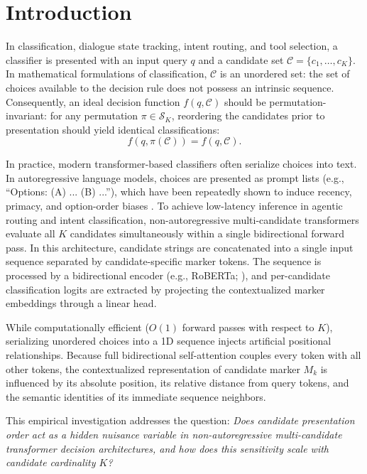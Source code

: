 \documentclass[11pt,a4paper]{article}
\begin{document}
\section{Introduction}

In classification, dialogue state tracking, intent routing, and tool selection, a classifier is presented with an input query $q$ and a candidate set $\mathcal{C} = \{c_1, \dots, c_K\}$. In mathematical formulations of classification, $\mathcal{C}$ is an unordered set: the set of choices available to the decision rule does not possess an intrinsic sequence. Consequently, an ideal decision function $f(q, \mathcal{C})$ should be permutation-invariant: for any permutation $\pi \in \mathcal{S}_K$, reordering the candidates prior to presentation should yield identical classifications:
\begin{equation}
f(q, \pi(\mathcal{C})) = f(q, \mathcal{C}).
\end{equation}

In practice, modern transformer-based classifiers often serialize choices into text. In autoregressive language models, choices are presented as prompt lists (e.g., ``Options: (A) ... (B) ...''), which have been repeatedly shown to induce recency, primacy, and option-order biases \citep{liu2024lost, pezeshkpour2024large, zheng2024large}. To achieve low-latency inference in agentic routing and intent classification, non-autoregressive multi-candidate transformers \citep{laya2024} evaluate all $K$ candidates simultaneously within a single bidirectional forward pass. In this architecture, candidate strings are concatenated into a single input sequence separated by candidate-specific marker tokens. The sequence is processed by a bidirectional encoder (e.g., RoBERTa; \citealp{liu2019roberta}), and per-candidate classification logits are extracted by projecting the contextualized marker embeddings through a linear head.

While computationally efficient ($O(1)$ forward passes with respect to $K$), serializing unordered choices into a 1D sequence injects artificial positional relationships. Because full bidirectional self-attention couples every token with all other tokens, the contextualized representation of candidate marker $M_k$ is influenced by its absolute position, its relative distance from query tokens, and the semantic identities of its immediate sequence neighbors.

This empirical investigation addresses the question: \textit{Does candidate presentation order act as a hidden nuisance variable in non-autoregressive multi-candidate transformer decision architectures, and how does this sensitivity scale with candidate cardinality $K$?}
\end{document}
